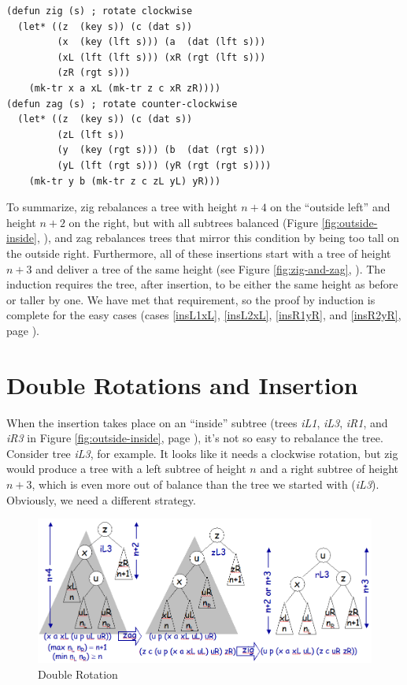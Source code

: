 \label{defun:zig-and-zag}
\begin{center}
\begin{Verbatim}
(defun zig (s) ; rotate clockwise
  (let* ((z  (key s)) (c (dat s))
         (x  (key (lft s))) (a  (dat (lft s)))
         (xL (lft (lft s))) (xR (rgt (lft s)))
         (zR (rgt s)))
    (mk-tr x a xL (mk-tr z c xR zR))))
(defun zag (s) ; rotate counter-clockwise
  (let* ((z  (key s)) (c (dat s))
         (zL (lft s))
         (y  (key (rgt s))) (b  (dat (rgt s)))
         (yL (lft (rgt s))) (yR (rgt (rgt s))))
    (mk-tr y b (mk-tr z c zL yL) yR)))
\end{Verbatim}
\end{center}

To summarize, zig rebalances a tree with height $n+4$
on the ``outside left'' and height $n+2$ on the right,
but with all subtrees balanced
(Figure \ref{fig:outside-inside}, \pageref{fig:outside-inside}),
and zag rebalances trees that mirror this condition
by being too tall on the outside right.
Furthermore, all of these insertions start with a tree of height
$n+3$ and deliver a tree of the same height
(see Figure \ref{fig:zig-and-zag}, \pageref{fig:zig-and-zag}).
The induction requires the tree, after insertion, to be either
the same height as before or taller by one.
We have met that requirement,
so the proof by induction is complete for the easy cases
(cases \ref{insL1xL}, \ref{insL2xL}, \ref{insR1yR}, and \ref{insR2yR},
page \pageref{out-of-balance-cases}).

\section{Double Rotations and Insertion}

When the insertion takes place on an ``inside'' subtree
(trees \emph{iL1}, \emph{iL3}, \emph{iR1}, and \emph{iR3}
in Figure \ref{fig:outside-inside}, page \pageref{fig:outside-inside}),
it's not so easy to rebalance the tree.
Consider tree \emph{iL3}, for example.
It looks like it needs a clockwise rotation,
but zig would produce a tree with a left subtree of height $n$
and a right subtree of height $n+3$, which is even more out
of balance than the tree we started with (\emph{iL3}).
Obviously, we need a different strategy.

\begin{figure}
\begin{center}
\includegraphics[scale=0.5]{images/double-rotation.png}
\end{center}
\caption{Double Rotation}
\label{fig:double-rotation}
\end{figure}

